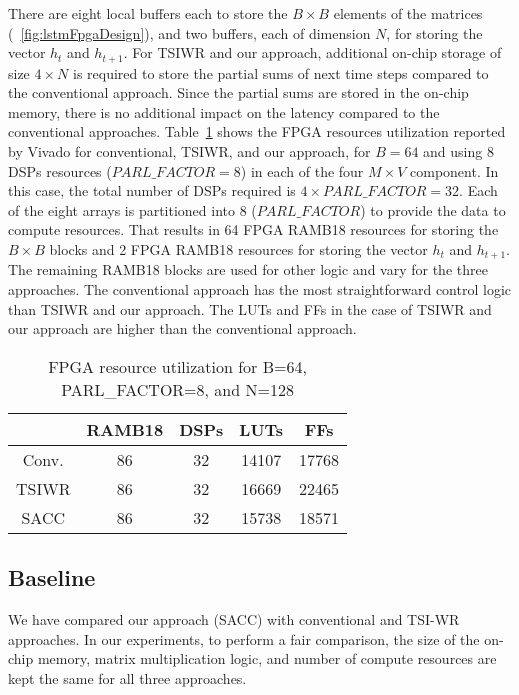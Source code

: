 {There are eight local buffers each to store the $B{\times}B$ elements of the matrices (\figurename{~\ref{fig:lstmFpgaDesign}}), and two buffers, each of dimension $N$, for storing the vector $h_t$ and $h_{t{+}1}$. For TSIWR and our approach, additional on-chip storage of size $4{\times}N$ is required to store the partial sums of next time steps compared to the conventional approach. Since the partial sums are stored in the on-chip memory, there is no additional impact on the latency compared to the conventional approaches. Table~\ref{tab:fpgaResources} shows the FPGA resources utilization reported by Vivado for conventional, TSIWR, and our approach, for $B{=}64$ and using 8 DSPs resources ($PARL\_FACTOR{=}8$) in each of the four $M{\times}V$ component. In this case, the total number of DSPs required is $4{\times}PARL\_FACTOR{=}32$.
Each of the eight arrays is partitioned into 8 ($PARL\_FACTOR$) to provide the data to compute resources. That results in 64 FPGA RAMB18 resources for storing the $B{\times}B$ blocks and 2 FPGA RAMB18 resources for storing the vector $h_t$ and $h_{t{+}1}$. The remaining RAMB18 blocks are used for other logic and vary for the three approaches. The conventional approach has the most straightforward control logic than TSIWR and our approach. The LUTs and FFs in the case of TSIWR and our approach are higher than the conventional approach. 
\begin{table}[htb]
	\centering
	\caption{FPGA resource utilization for B=64, PARL\_FACTOR=8, and N=128 }
	\label{tab:fpgaResources}
	\begin{tabular}{ccccc}
		\hline
		& RAMB18 & DSPs & LUTs  & FFs   \\ \hline
		Conv. & 86     & 32   & 14107 & 17768 \\ \hline
		TSIWR & 86     & 32   & 16669 & 22465 \\ \hline
		SACC  & 86     & 32   & 15738 & 18571 \\ \hline
	\end{tabular}
\end{table}
\subsection{Baseline}
We have compared our approach (SACC) with conventional and TSI-WR~\cite{park2020time} approaches. In our experiments, to perform a fair comparison, the size of the on-chip memory, matrix multiplication logic, and number of compute resources are kept the same for all three approaches.

}
